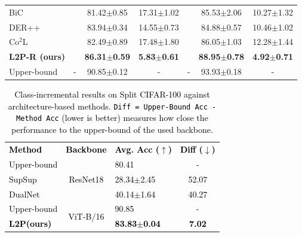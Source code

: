 \documentclass[10pt,twocolumn,letterpaper]{article}
\newcommand{\cam}[1]{\textcolor{black}{#1}}
\newcommand{\methodabbr}{L2P\xspace}
\begin{document}
\begin{table}[t]
\begin{center}
\begin{tabular}{l||c|cc||c|cc}
 BiC \cite{wu2019large} & & 81.42\scriptsize{$\pm$0.85} & 17.31\scriptsize{$\pm$1.02} && 85.53\scriptsize{$\pm$2.06} & 10.27\scriptsize{$\pm$1.32} \\
 DER++ \cite{buzzega2020dark} & & 83.94\scriptsize{$\pm$0.34} & 14.55\scriptsize{$\pm$0.73} && 84.88\scriptsize{$\pm$0.57} & 10.46\scriptsize{$\pm$1.02} \\
 Co$^2$L \cite{cha2021co2l} & & 82.49\scriptsize{$\pm$0.89} & 17.48\scriptsize{$\pm$1.80} && 86.05\scriptsize{$\pm$1.03} & 12.28\scriptsize{$\pm$1.44} \\
 \textbf{\methodabbr-R (ours)} & & \bf{86.31\scriptsize{$\pm$0.59}} & \bf{5.83\scriptsize{$\pm$0.61}} && \bf{88.95\scriptsize{$\pm$0.78}} & \bf{4.92\scriptsize{$\pm$0.71}} \\
 \midrule
 Upper-bound & -& 90.85\scriptsize{$\pm$0.12} & - & - & 93.93\scriptsize{$\pm$0.18} & - \\
\bottomrule
\end{tabular}
\end{center}
\vspace{-.6cm}
\end{table}


\begin{table}[t!]
\small
\caption{\cam{Class-incremental results on Split CIFAR-100 against architecture-based methods. \texttt{Diff = Upper-Bound Acc - Method Acc} (lower is better) measures how close the performance to the upper-bound of the used backbone.}}
\vspace{-6mm}
\label{table:architecture}
\begin{center}
\cam{
\begin{tabular}{l||c|lc}
\toprule 
 \multirow{2}{*}{\textbf{Method}} & \multirow{2}{*}{\textbf{Backbone}} & \multirow{2}{*}{\textbf{Avg. Acc ($\uparrow$)}} & \multirow{2}{*}{\textbf{Diff ($\downarrow$)}} \\
& &  &   \\
\midrule
  Upper-bound & \multirow{3}{*}{ResNet18}& 80.41 & -   \\
   SupSup~\cite{wortsman2020supermasks} & & 28.34\scriptsize{$\pm$2.45} & 52.07   \\
   DualNet~\cite{pham2021dualnet} & & 40.14\scriptsize{$\pm$1.64} & 40.27 \\
 \midrule
Upper-bound & \multirow{2}{*}{ViT-B/16}& 90.85 & -  \\
 \bf\methodabbr(ours) &  & \bf{83.83\scriptsize{$\pm$0.04}} & \bf 7.02 \\
 \bottomrule
\end{tabular}
}
\\
\end{center}
\vspace{-.7cm}
\end{table}
\end{document}
